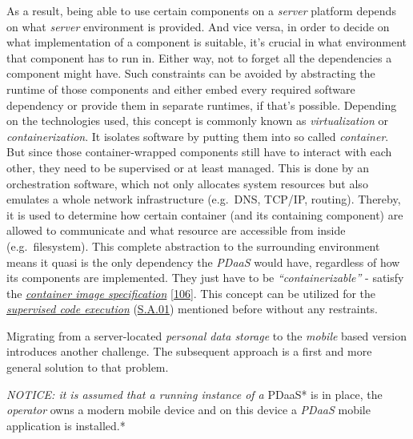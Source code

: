 \documentclass[12pt,english,a4paper,titlepage,cleardoublepage=empty,dottedtoc]{report}
\begin{document}
As a result, being able to use certain components on a \emph{server}
platform depends on what \emph{server} environment is provided. And vice
versa, in order to decide on what implementation of a component is
suitable, it's crucial in what environment that component has to run in.
Either way, not to forget all the dependencies a component might have.
Such constraints can be avoided by abstracting the runtime of those
components and either embed every required software dependency or
provide them in separate runtimes, if that's possible. Depending on the
technologies used, this concept is commonly known as
\emph{virtualization} or \emph{containerization}. It isolates software
by putting them into so called \emph{container}. But since those
container-wrapped components still have to interact with each other,
they need to be supervised or at least managed. This is done by an
orchestration software, which not only allocates system resources but
also emulates a whole network infrastructure (e.g.~DNS, TCP/IP,
routing). Thereby, it is used to determine how certain container (and
its containing component) are allowed to communicate and what resource
are accessible from inside (e.g.~filesystem). This complete abstraction
to the surrounding environment means it quasi is the only dependency the
\emph{PDaaS} would have, regardless of how its components are
implemented. They just have to be \emph{``containerizable''} - satisfy
the \emph{\protect\hyperlink{link-container}{container image
specification}} {[}\protect\hyperlink{ref-web_oci-spec_image}{106}{]}.
This concept can be utilized for the
\emph{\protect\hyperlink{supervised-data-access}{supervised code
execution}} (\protect\hyperlink{sa01}{S.A.01}) mentioned before without
any restraints.

Migrating from a server-located \emph{personal data storage} to the
\emph{mobile} based version introduces another challenge. The subsequent
approach is a first and more general solution to that problem.

\emph{NOTICE: it is assumed that a running instance of a }PDaaS* is in
place, the \emph{operator} owns a modern mobile device and on this
device a \emph{PDaaS} mobile application is installed.*
\end{document}
